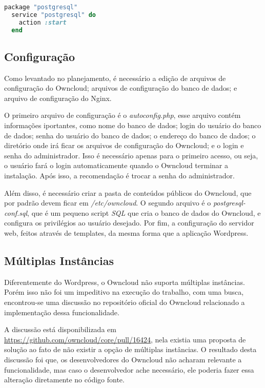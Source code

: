 \begin{lstlisting}[language=Ruby,label=dice_index,caption={Exemplo de como habilitar serviço do postgresql com chef}, label=codigo995]
  package "postgresql"
  service "postgresql" do
    action :start
  end
\end{lstlisting}

\subsection{Configuração}

Como levantado no planejamento, é necessário a edição de arquivos de configuração
do Owncloud; arquivos de configuração do banco de dados; e arquivo de configuração
do Nginx.

O primeiro arquivo de configuração é o \textit{autoconfig.php}, esse arquivo
contém informações iportantes, como nome do banco de dados;
login do usuário do banco de dados; senha do usuário do banco de dados; o endereço 
do banco de dados; o diretório
onde irá ficar os arquivos de configuração do Owncloud; e o login e senha
do administrador. Isso é necessário apenas para o primeiro acesso, ou seja, o usuário
fará o login automaticamente quando o Owncloud terminar a instalação. Após isso,
a recomendação é trocar a senha do administrador.

Além disso, é necessário criar a pasta de conteúdos públicos do Owncloud, que por
padrão devem ficar em \textit{/etc/owncloud}. O segundo arquivo é o 
\textit{postgresql-conf.sql}, que é um pequeno script \textit{SQL} que cria o 
banco de dados do Owncloud, e configura os
privilégios ao usuário desejado. Por fim, a configuração do servidor web, feitos
através de templates, da mesma forma que a aplicação Wordpress.

\subsection{Múltiplas Instâncias}

Diferentemente do Wordpress, o Owncloud não suporta múltiplas instâncias. Porém isso
não foi um impeditivo na execução do trabalho, com uma busca, encontrou-se uma 
discussão no repositório oficial do Owncloud relacionado a implementação dessa 
funcionalidade. 

A discussão está disponibilizada em 
\url{https://github.com/owncloud/core/pull/16424}, nela existia
uma proposta de solução ao fato de não existir a opção de múltiplas instâncias. O
resultado desta discussão foi que, os desenvolvedores do Owncloud não acharam relevante
a funcionalidade, mas caso o desenvolvedor ache necessário, ele poderia fazer essa
alteração diretamente no código fonte.

